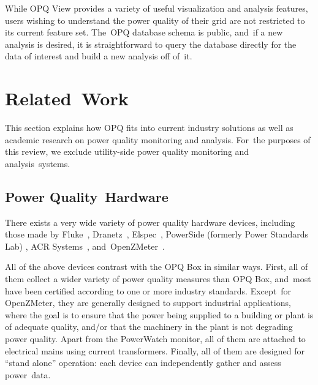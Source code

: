 \documentclass[energies,article,accept,moreauthors,pdftex]{Definitions/mdpi}
\begin{document}
While OPQ View provides a variety of useful visualization and analysis features, users wishing to understand the power quality of their grid are not restricted to its current feature set. The~OPQ database schema is public, and~if a new analysis is desired, it is straightforward to query the database directly for the data of interest and build a new analysis off of~it.















\section{Related~Work}
\label{sec:related-work}

This section explains how OPQ fits into current industry solutions as well as academic research on power quality monitoring and analysis. For~the purposes of this review, we exclude utility-side power quality monitoring and analysis~systems.

\subsection{Power Quality~Hardware}
\label{sec:commercial-pq-devices}

There exists a very wide variety of power quality hardware devices, including those made by Fluke~\cite{fluke_fluke_2020}, Dranetz~\cite{dranetz_dranetz_2020}, Elspec~\cite{elspec_elspec_2020}, PowerSide (formerly Power Standards Lab) \cite{powerside_powerside_2020}, ACR Systems~\cite{acr_acr_2020}, and~OpenZMeter~\cite{viciana_openzmeter_2018}.

All of the above devices contrast with the OPQ Box in similar ways. First, all of them collect a wider variety of power quality measures than OPQ Box, and~most have been certified according to one or more industry standards. Except~for OpenZMeter, they are generally designed to support industrial applications, where the goal is to ensure that the power being supplied to a building or plant is of adequate quality, and/or that the machinery in the plant is not degrading power quality. Apart from the PowerWatch monitor, all of them are attached to electrical mains using current transformers. Finally, all of them are designed for “stand alone” operation: each device can independently gather and assess power~data.
\end{document}
